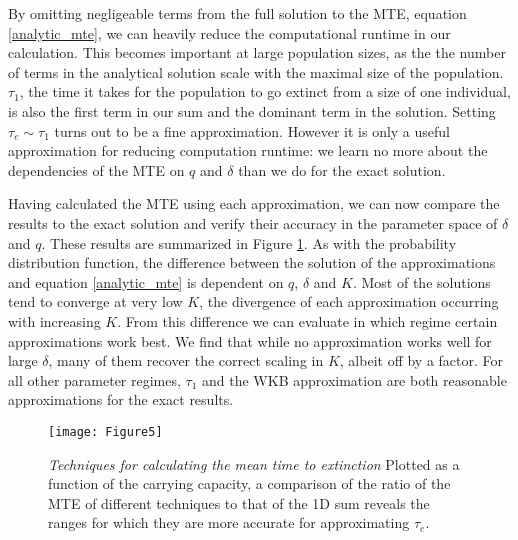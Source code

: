 \documentclass[a4paper,10pt]{article}
\numberwithin{equation}{section} %
\begin{document}
By omitting negligeable terms from the full solution to the MTE, equation \ref{analytic_mte}, we can heavily reduce the computational runtime in our calculation.
This becomes important at large population sizes, as the the number of terms in the analytical solution scale with the maximal size of the population.
$\tau_1$, the time it takes for the population to go extinct from a size of one individual, is also the first term in our sum and the dominant term in the solution.
Setting $\tau_e \sim \tau_1$ turns out to be a fine approximation.
However it is only a useful approximation for reducing computation runtime: we learn no more about the dependencies of the MTE on $q$ and $\delta$ than we do for the exact solution. 

Having calculated the MTE using each approximation, we can now compare the results to the exact solution and verify their accuracy in the parameter space of $\delta$ and $q$.
These results are summarized in Figure \ref{mte_techn}.
As with the probability distribution function, the difference between the solution of the approximations and equation \ref{analytic_mte} is dependent on $q$, $\delta$ and $K$. 
Most of the solutions tend to converge at very low $K$, the divergence of each approximation occurring with increasing $K$. 
From this difference we can evaluate in which regime certain approximations work best.
We find that while no approximation works well for large $\delta$, many of them recover the correct scaling in $K$, albeit off by a factor. %
For all other parameter regimes, $\tau_1$ and the WKB approximation are both reasonable approximations for the exact results. %

\begin{figure}[ht!]
	\centering
	\texttt{[image: Figure5]}
	\caption{\emph{Techniques for calculating the mean time to extinction} Plotted as a function of the carrying capacity, a comparison of the ratio of the MTE of different techniques to that of the 1D sum reveals the ranges for which they are more accurate for approximating $\tau_{e}$.} \label{mte_techn}
\end{figure}
\end{document}
